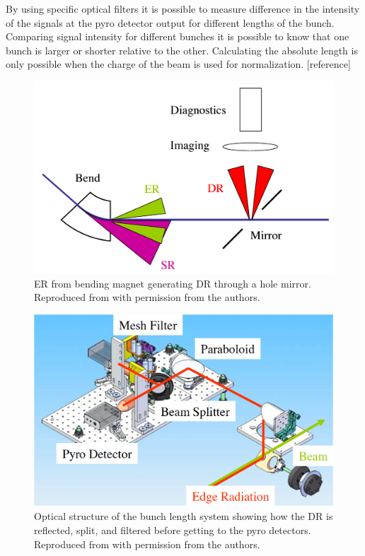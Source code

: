 \documentclass[letter,
               biblatex,     %
               keeplastbox,   %
               ]{jacow}
\begin{document}
By using specific optical filters it is possible to measure difference in the intensity of the signals at the pyro detector output for different lengths of the bunch. Comparing signal intensity for different bunches it is possible to know that one bunch is larger or shorter relative to the other. Calculating the absolute length is only possible when the charge of the beam is used for normalization. [reference]

\begin{figure}[!htb]
   \centering
   \includegraphics*[width=\columnwidth]{BunchLengthStruct_1}
   \caption{ER from bending magnet generating DR through a hole mirror. Reproduced from \cite{blen-pac07} with permission from the authors.}
   \label{fig:blen_struct1}
\end{figure}

\begin{figure}[!htb]
   \centering
   \includegraphics*[width=\columnwidth]{BunchLengthStruct_2}
   \caption{Optical structure of the bunch length system showing how the DR is reflected, split, and filtered before getting to the pyro detectors. Reproduced from \cite{blen-pac07} with permission from the authors.}
   \label{fig:blen_struct2}
\end{figure}
\end{document}
